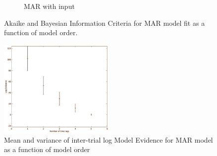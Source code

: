 \documentclass[a4paper,10pt]{article}
\begin{document}
\begin{figure}
\begin{subfigure}[b]{0.4\textwidth}
        \caption{MAR with input}
        \label{fig:marN_analytic_withinput_aicbic}
    \end{subfigure}\hspace{0.03\textwidth}
    \caption{Akaike and Bayesian Information Criteria for MAR model fit as a function of model order.}
    \label{fig:MAR_AIC_BIC}
\end{figure}

\begin{figure}
  \centering
  \includegraphics[width=0.5\textwidth]{img/marN-penny-model-evidence.png}
  \caption{Mean and variance of inter-trial log Model Evidence for MAR model as a function of model order}
  \label{fig:marN-penny-model-evidence}
\end{figure}
\end{document}
